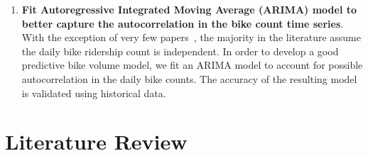 \documentclass [11pt, proquest] {uwthesis}[2015/03/03]
\begin{document}
\begin{enumerate}
\item \textbf{Fit Autoregressive Integrated Moving Average (ARIMA) model to better capture the autocorrelation in the bike count time series}. With the exception of very few papers~\cite{Gallop:2012aa,Nosal:2014aa}, the majority in the literature assume the daily bike ridership count is independent. In order to develop a good predictive bike volume model, we fit an ARIMA model to account for possible autocorrelation in the daily bike counts. The accuracy of the resulting model is validated using historical data.
\end{enumerate}
 
 
 
\chapter{Literature Review}
\end{document}
